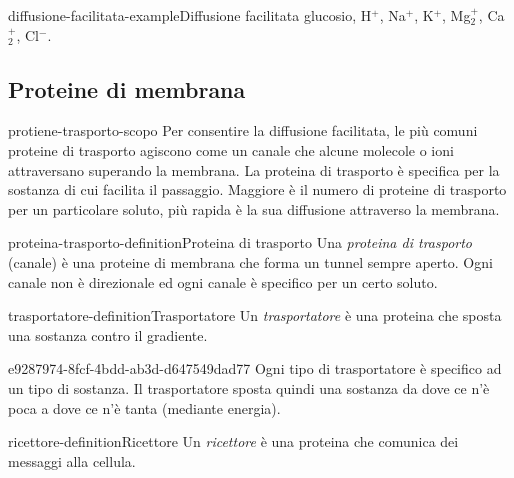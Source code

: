 \documentclass[preview]{standalone}
\begin{document}
\begin{snippetexample}{diffusione-facilitata-example}{Diffusione facilitata}
    glucosio, H\({}^+\), Na\({}^+\), K\({}^+\), Mg\({}_2^+\), Ca\({}_2^+\), Cl\({}^-\).
\end{snippetexample}


\subsection{Proteine di membrana}

\begin{snippet}{protiene-trasporto-scopo}
    Per consentire la diffusione facilitata, le più
    comuni proteine di trasporto agiscono come un canale che alcune molecole o ioni
    attraversano superando la membrana. La proteina di trasporto è specifica per
    la sostanza di cui facilita il passaggio. Maggiore
    è il numero di proteine di trasporto per un particolare soluto, più rapida è la sua diffusione
    attraverso la membrana.
\end{snippet}

\begin{snippetdefinition}{proteina-trasporto-definition}{Proteina di trasporto}
    Una \textit{proteina di trasporto} (canale) è una proteine di membrana che forma un tunnel sempre aperto.
    Ogni canale non è direzionale ed ogni canale è specifico per un certo soluto.
\end{snippetdefinition}


\begin{snippetdefinition}{trasportatore-definition}{Trasportatore}
    Un \textit{trasportatore} è una proteina che sposta una sostanza contro il gradiente.
\end{snippetdefinition}

\begin{snippet}{e9287974-8fcf-4bdd-ab3d-d647549dad77}
    Ogni tipo di trasportatore è specifico ad un tipo di sostanza.
    Il trasportatore sposta quindi una sostanza da dove ce n'è poca a dove ce n'è tanta (mediante energia).
\end{snippet}

\begin{snippetdefinition}{ricettore-definition}{Ricettore}
    Un \textit{ricettore} è una proteina che comunica dei messaggi alla cellula.
\end{snippetdefinition}
\end{document}
